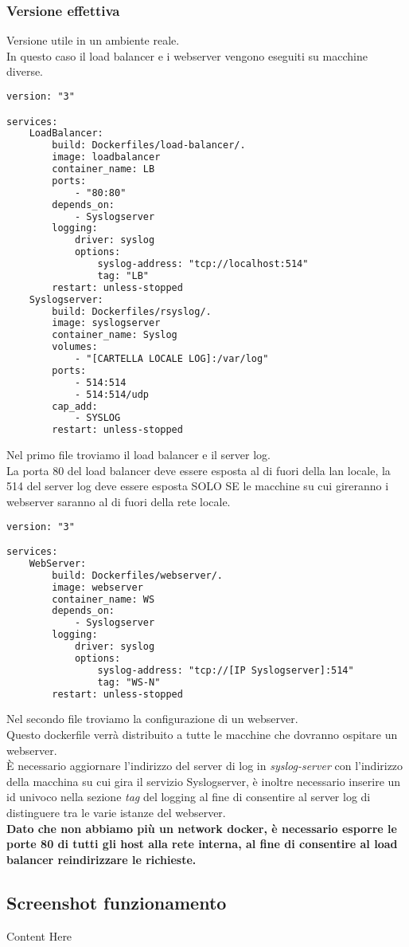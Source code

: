 \documentclass[../DocumentazioneProgetto.tex]{subfiles}
\begin{document}
	\subsubsection{Versione effettiva} 
	Versione utile in un ambiente reale.\\
	In questo caso il load balancer e i webserver vengono eseguiti su macchine diverse.
	\begin{lstlisting}[language=XML, caption=Docker Compose Reale Load Balancer] 
version: "3"

services:
	LoadBalancer:
		build: Dockerfiles/load-balancer/.
		image: loadbalancer
		container_name: LB
		ports:
			- "80:80"
		depends_on:
			- Syslogserver
		logging:
			driver: syslog
			options:
				syslog-address: "tcp://localhost:514"
				tag: "LB"
		restart: unless-stopped
	Syslogserver:
		build: Dockerfiles/rsyslog/.
		image: syslogserver
		container_name: Syslog
		volumes:
			- "[CARTELLA LOCALE LOG]:/var/log"
		ports:
			- 514:514
			- 514:514/udp
		cap_add:
			- SYSLOG
		restart: unless-stopped\end{lstlisting}
		Nel primo file troviamo il load balancer e il server log.\\
		La porta 80 del load balancer deve essere esposta al di fuori della lan locale, la 514 del server log deve essere esposta SOLO SE le macchine su cui gireranno i webserver saranno al di fuori della rete locale.

\begin{lstlisting}[language=XML, caption=Docker Compose Reale Load Balancer] 
version: "3"

services:
	WebServer:
		build: Dockerfiles/webserver/.
		image: webserver
		container_name: WS
		depends_on:
			- Syslogserver
		logging:
			driver: syslog
			options:
				syslog-address: "tcp://[IP Syslogserver]:514"
				tag: "WS-N"
		restart: unless-stopped\end{lstlisting}
	Nel secondo file troviamo la configurazione di un webserver.\\
	Questo dockerfile verrà distribuito a tutte le macchine che dovranno ospitare un webserver.\\
	È necessario aggiornare l'indirizzo del server di log in \textit{syslog-server} con l'indirizzo della macchina su cui gira il servizio Syslogserver, è inoltre necessario inserire un id univoco nella sezione \textit{tag} del logging al fine di consentire al server log di distinguere tra le varie istanze del webserver.\\
	\textbf{Dato che non abbiamo più un network docker, è necessario esporre le porte 80 di tutti gli host alla rete interna, al fine di consentire al load balancer reindirizzare le richieste.} 

	\subsection{Screenshot funzionamento} 
	Content Here
\end{document}
